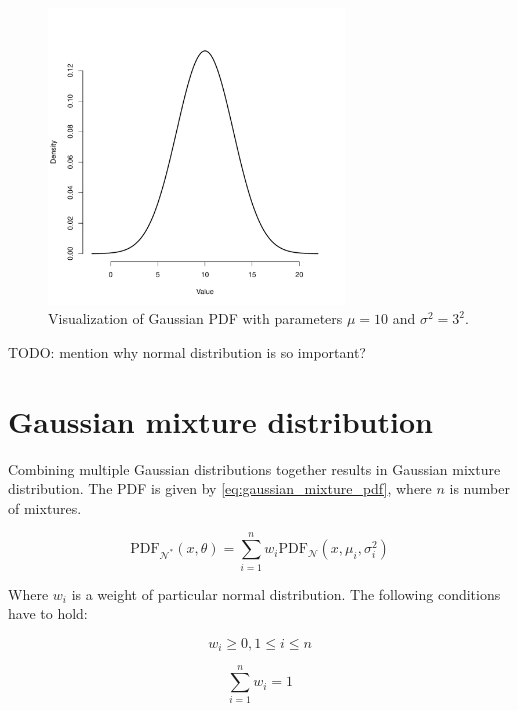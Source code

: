 \documentclass[thesis=B,english]{FITthesis}[2012/06/26]
\begin{document}
\begin{figure}
	\centering
 	\includegraphics[width=0.7\textwidth]{gaussian}
 	\caption{Visualization of Gaussian PDF with parameters $\mu=10$ and $\sigma^2=3^2$.}
 	\label{fig:gaussian}
\end{figure}

TODO: mention why normal distribution is so important?

\section{Gaussian mixture distribution}

Combining multiple Gaussian distributions together results in Gaussian mixture distribution. The PDF is given by \ref{eq:gaussian_mixture_pdf}, where $n$ is number of mixtures.

\begin{equation} \label{eq:gaussian_mixture_pdf}
\text{PDF}_{\mathcal{N}^*}(x,\theta) = \sum_{i=1}^n w_i \text{PDF}_{\mathcal{N}}(x,\mu_i,\sigma^2_i)
\end{equation}

Where $w_i$ is a weight of particular normal distribution. The following conditions have to hold:

\begin{equation}
w_i \geq 0, 1 \leq i \leq n
\end{equation}

\begin{equation}
\sum_{i=1}^n w_i = 1
\end{equation}
\end{document}
